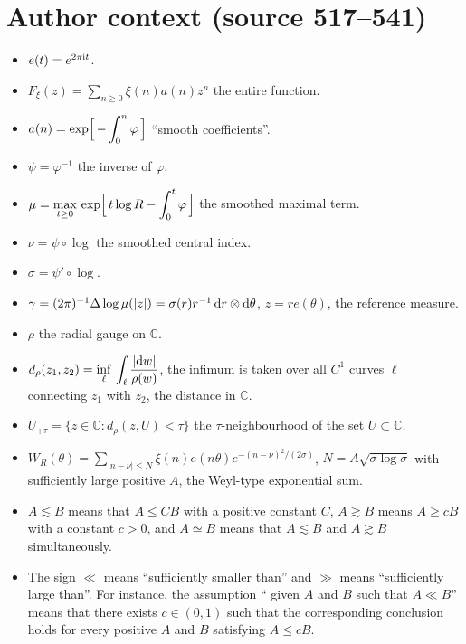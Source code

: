 \documentclass[10pt,a4paper]{amsart}
\newcommand{\bC}{\mathbb C}
\begin{document}
\section*{Author context (source 517--541)}
\begin{itemize}
\item $e(t)=e^{2\pi {\rm i}t}$.
\item $F_\xi(z) = \displaystyle \sum_{n\ge 0} \xi(n) a(n) z^n$ the entire function.
\item $a(n) = \displaystyle \exp\Bigl[\, -\int_0^n \varphi \,\Bigr]$ ``smooth coefficients''.
\item $\psi = \varphi^{-1}$ the inverse of $\varphi$.
\item $\mu = \displaystyle \max_{t\ge 0}\, \exp\Bigl[\,
t\log R - \int_0^t \varphi \,\Bigr]$ the smoothed maximal term.
\item $\nu = \psi\circ\log$ the smoothed central index.
\item $\sigma = \psi'\circ\log$.
\item $\gamma=(2\pi)^{-1}\Delta\log\mu(|z|) =
\sigma (r)r^{-1}\, {\rm d}r \otimes {\rm d}\theta$, $z=r e(\theta)$, the reference measure.
\item $\rho$ the radial gauge on $\bC$.
\item $d_\rho (z_1, z_2) = \displaystyle \inf_\ell\, \int_\ell \frac{|{\rm d}w|}{\rho(w)}$,
the infimum is taken over all $C^1$ curves $\ell$ connecting $z_1$ with $z_2$, the distance in $\bC$.
\item $U_{+\tau} = \{z\in\bC\colon d_\rho(z, U)<\tau\}$ the $\tau$-neighbourhood of the set
$U\subset \bC$.
\item $W_R(\theta) = \displaystyle
\sum_{|n-\nu|\le N} \xi (n)e(n\theta) e^{-(n-\nu)^2/(2\sigma)}$,
$N=A\sqrt{\sigma\log\sigma}$ with sufficiently large positive $A$, the Weyl-type exponential sum.
\item $A\lesssim B$ means that $A\le CB$ with a positive constant $C$,
$A \gtrsim B$ means $A\ge cB$ with a constant $c>0$, and $A\simeq B$ means that $A\lesssim B$ and
$A\gtrsim B$ simultaneously.
\item The sign $\ll$ means ``sufficiently smaller than'' and $\gg$ means ``sufficiently large than''. For instance, the assumption `` given $A$ and $B$ such that $A\ll B$'' means that there exists
    $c\in (0, 1)$ such that the corresponding conclusion holds for every positive $A$ and $B$ satisfying $A\le cB$.
\end{itemize}
\end{document}
